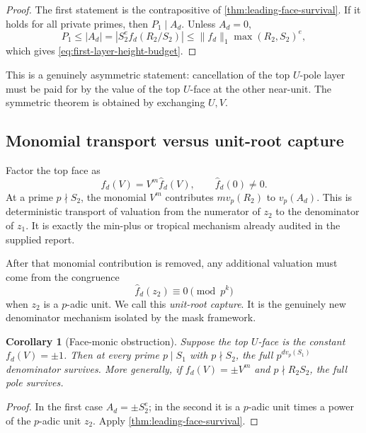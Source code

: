 \documentclass[11pt,oneside]{article}
\newtheorem{corollary}[theorem]{Corollary}
\theoremstyle{definition}
\theoremstyle{remark}
\begin{document}
\begin{proof}
The first statement is the contrapositive of \cref{thm:leading-face-survival}.  If it holds
for all private primes, then $P_1\mid A_d$.  Unless $A_d=0$,
\[
 P_1\le |A_d|=|S_2^e f_d(R_2/S_2)|
 \le \|f_d\|_1\max(R_2,S_2)^e,
\]
which gives \eqref{eq:first-layer-height-budget}.
\end{proof}

This is a genuinely asymmetric statement: cancellation of the top $U$-pole layer must be
paid for by the value of the top $U$-face at the other near-unit.  The symmetric theorem is
obtained by exchanging $U,V$.

\subsection{Monomial transport versus unit-root capture}
\label{subsec:monomial-vs-root}

Factor the top face as
\begin{equation}
 f_d(V)=V^m\widehat f_d(V),
 \qquad \widehat f_d(0)\ne0.
 \label{eq:face-factor}
\end{equation}
At a prime $p\nmid S_2$, the monomial $V^m$ contributes
$m v_p(R_2)$ to $v_p(A_d)$.  This is deterministic transport of valuation from the numerator
of $z_2$ to the denominator of $z_1$.  It is exactly the min-plus or tropical mechanism
already audited in the supplied report.

After that monomial contribution is removed, any additional valuation must come from the
congruence
\begin{equation}
 \widehat f_d(z_2)\equiv0\pmod{p^k}
 \label{eq:unit-root-capture}
\end{equation}
when $z_2$ is a $p$-adic unit.  We call this \emph{unit-root capture}.  It is the genuinely
new denominator mechanism isolated by the mask framework.

\begin{corollary}[Face-monic obstruction]
\label{cor:face-monic}
Suppose the top $U$-face is the constant $f_d(V)=\pm1$.  Then at every prime
$p\mid S_1$ with $p\nmid S_2$, the full $p^{d v_p(S_1)}$ denominator survives.  More
generally, if $f_d(V)=\pm V^m$ and $p\nmid R_2S_2$, the full pole survives.
\end{corollary}

\begin{proof}
In the first case $A_d=\pm S_2^e$; in the second it is a $p$-adic unit times a power of the
$p$-adic unit $z_2$.  Apply \cref{thm:leading-face-survival}.
\end{proof}
\end{document}
